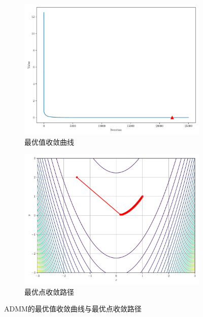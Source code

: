 \begin{figure}[!ht]
    \centering
    \begin{subfigure}{0.4\textwidth}
        \centering
        \includegraphics[width=\textwidth]{figures/ADMM_loss.pdf}
        \caption{最优值收敛曲线}
    \end{subfigure}
    \begin{subfigure}{0.4\textwidth}
        \centering
        \includegraphics[width=\textwidth]{figures/ADMM_points.pdf}
        \caption{最优点收敛路径}
    \end{subfigure}
    \caption{ADMM的最优值收敛曲线与最优点收敛路径}
\end{figure}
